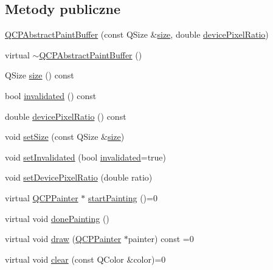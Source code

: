 \subsection*{Metody publiczne}
\begin{DoxyCompactItemize}
\item 
\hyperlink{class_q_c_p_abstract_paint_buffer_a3ce532c12f10b81697108835755641e2}{Q\+C\+P\+Abstract\+Paint\+Buffer} (const Q\+Size \&\hyperlink{class_q_c_p_abstract_paint_buffer_aad79fd72221e4614a771c03985798d9b}{size}, double \hyperlink{class_q_c_p_abstract_paint_buffer_a107d55bb234b5d19651157071d3b2c37}{device\+Pixel\+Ratio})
\item 
virtual \hyperlink{class_q_c_p_abstract_paint_buffer_a50fbb1265814d019a1707f4cb11e20de}{$\sim$\+Q\+C\+P\+Abstract\+Paint\+Buffer} ()
\item 
Q\+Size \hyperlink{class_q_c_p_abstract_paint_buffer_aad79fd72221e4614a771c03985798d9b}{size} () const 
\item 
bool \hyperlink{class_q_c_p_abstract_paint_buffer_a4b8de01a2485c2bf8e98fdbec7f0bcc6}{invalidated} () const 
\item 
double \hyperlink{class_q_c_p_abstract_paint_buffer_a107d55bb234b5d19651157071d3b2c37}{device\+Pixel\+Ratio} () const 
\item 
void \hyperlink{class_q_c_p_abstract_paint_buffer_a8b68c3cd36533f1a4a23b5ce8cd66f01}{set\+Size} (const Q\+Size \&\hyperlink{class_q_c_p_abstract_paint_buffer_aad79fd72221e4614a771c03985798d9b}{size})
\item 
void \hyperlink{class_q_c_p_abstract_paint_buffer_ae4c7dc70dfc66be2879ce297b2b3d67f}{set\+Invalidated} (bool \hyperlink{class_q_c_p_abstract_paint_buffer_a4b8de01a2485c2bf8e98fdbec7f0bcc6}{invalidated}=true)
\item 
void \hyperlink{class_q_c_p_abstract_paint_buffer_a555eaad5d5c806420ff35602a1bb68fa}{set\+Device\+Pixel\+Ratio} (double ratio)
\item 
virtual \hyperlink{class_q_c_p_painter}{Q\+C\+P\+Painter} $\ast$ \hyperlink{class_q_c_p_abstract_paint_buffer_a9e9f29b19c033cf02fb96f1a148463f3}{start\+Painting} ()=0
\item 
virtual void \hyperlink{class_q_c_p_abstract_paint_buffer_a41b0dc6e7744f19fae09f8532c207dc1}{done\+Painting} ()
\item 
virtual void \hyperlink{class_q_c_p_abstract_paint_buffer_afb998c7525e3ae37d9d2d46c7aaf461a}{draw} (\hyperlink{class_q_c_p_painter}{Q\+C\+P\+Painter} $\ast$painter) const =0
\item 
virtual void \hyperlink{class_q_c_p_abstract_paint_buffer_a9e253f4541dfc01992b77e8830bd7722}{clear} (const Q\+Color \&color)=0
\end{DoxyCompactItemize}
